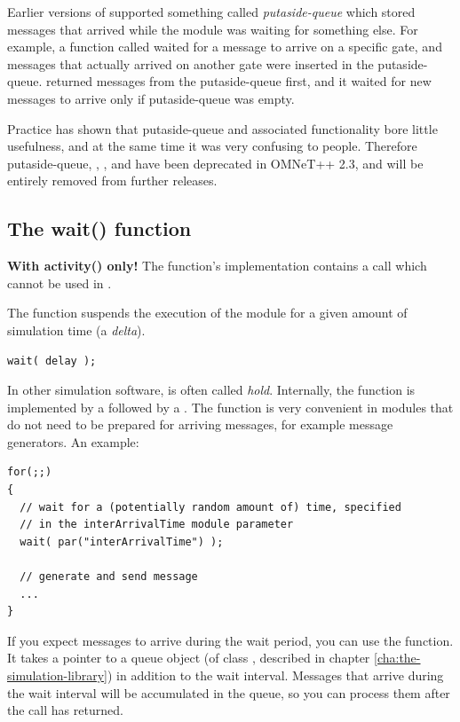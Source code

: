 Earlier versions of {\opp} supported something called \textit{putaside-queue}
which stored messages that arrived while the module was waiting for
something else. For example, a function called  waited
for a message to arrive on a specific gate, and messages that actually
arrived on another gate were inserted in the putaside-queue.
 returned messages from the putaside-queue first,
and it waited for new messages to arrive only if putaside-queue
was empty.

Practice has shown that putaside-queue and associated functionality
bore little usefulness, and at the same time it was very confusing
to people. Therefore putaside-queue, , ,
and  have been deprecated in OMNeT++ 2.3, and
will be entirely removed from further releases.



\subsection{The wait() function}

\textbf{With activity() only!} The  function's implementation
contains a  call which cannot be used in .

The  function suspends the execution of the module for
a given amount of simulation time (a \textit{delta}).

\begin{verbatim}
wait( delay );
\end{verbatim}

In other simulation software,  is often called \textit{hold}.
Internally, the  function is implemented by a
 followed by a .
The  function is very convenient in modules that do not need
to be prepared for arriving messages, for example message generators.
An example:

\begin{verbatim}
for(;;)
{
  // wait for a (potentially random amount of) time, specified
  // in the interArrivalTime module parameter
  wait( par("interArrivalTime") );

  // generate and send message
  ...
}
\end{verbatim}

If you expect messages to arrive during the wait period, you can
use the  function. It takes a pointer to a queue object
(of class , described in chapter \ref{cha:the-simulation-library})
in addition to the wait interval. Messages that arrive during the
wait interval will be accumulated in the queue, so you can
process them after the  call has returned.

